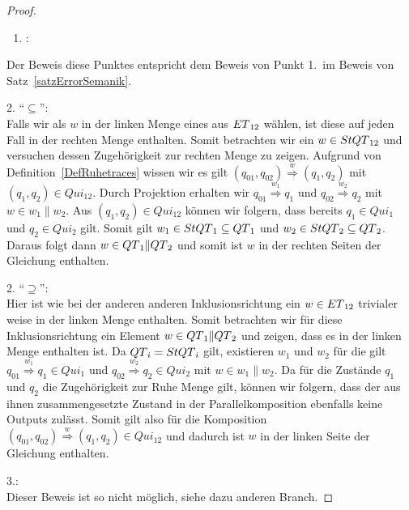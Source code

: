 \begin{proof}
  ~
  \begin{enumerate}
    \item \hspace{-0.2cm}:
  \end{enumerate}
  \vspace{-0.3cm}
  Der Beweis diese Punktes entspricht dem Beweis von Punkt 1.\ im Beweis von
  Satz~\ref{satzErrorSemanik}.

  2. ``$\subseteq$'':\\
  Falls wir als $w$ in der linken Menge eines aus $ET{}_{12}$ wählen, ist
  diese auf jeden Fall in der rechten Menge enthalten. Somit betrachten wir ein
  $w\in StQT{}_{12}$ und versuchen dessen Zugehörigkeit zur rechten Menge zu
  zeigen. Aufgrund von Definition~\ref{DefRuhetraces} wissen wir es gilt
  $(q_{01},q_{02}) \overset{w}{\Rightarrow} (q_1,q_2)$ mit $(q_1,q_2)\in
  Qui_{12}$. Durch Projektion erhalten wir $q_{01} \overset{w_1}{\Rightarrow}
  q_1$ und $q_{02} \overset{w_2}{\Rightarrow} q_2$ mit $w\in w_1\|w_2$. Aus
  $(q_1,q_2)\in Qui_{12}$ können wir folgern, dass bereits $q_1\in Qui_1$ und
  $q_2\in Qui_2$ gilt. Somit gilt $w_1\in StQT{}_1\subseteq QT{}_1$ und
  $w_2\in StQT{}_2\subseteq QT{}_2$. Daraus folgt dann $w\in
  QT{}_1\|QT{}_2$ und somit ist $w$ in der rechten Seiten der Gleichung
  enthalten.

  2. ``$\supseteq$'':\\
  Hier ist wie bei der anderen anderen Inklusionsrichtung ein $w\in ET{}_{12}$
  trivialer weise in der linken Menge enthalten. Somit betrachten wir für diese
  Inklusionsrichtung ein Element $w\in QT{}_1\|QT{}_2$ und zeigen, dass es in
  der linken Menge enthalten ist. Da $QT{}_i = StQT{}_i$ gilt, existieren
  $w_1$ und $w_2$ für die gilt $q_{01} \overset{w_1}{\Rightarrow} q_1\in Qui_1$
  und $q_{02} \overset{w_2}{\Rightarrow} q_2\in Qui_2$ mit $w\in w_1\| w_2$. Da
  für die Zustände $q_1$ und $q_2$ die Zugehörigkeit zur Ruhe Menge gilt,
  können wir folgern, dass der aus ihnen zusammengesetzte Zustand in der
  Parallelkomposition ebenfalls keine Outputs zulässt. Somit gilt also für die
  Komposition $(q_{01},q_{02}) \overset{w}{\Rightarrow} (q_1,q_2)\in Qui_{12}$
  und dadurch ist $w$ in der linken Seite der Gleichung enthalten.

  3.:\\
  Dieser Beweis ist so nicht möglich, siehe dazu anderen Branch. %
\end{proof}

